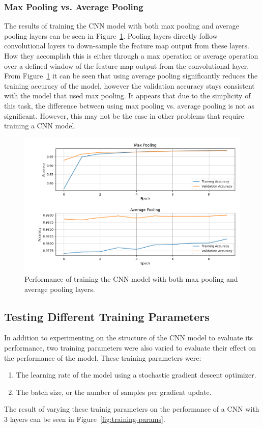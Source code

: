 \documentclass[a4paper]{article}
\begin{document}
\subsubsection{Max Pooling vs. Average Pooling}

The results of training the CNN model with both max pooling and average pooling layers can be seen in Figure~\ref{fig:pooling}. Pooling layers directly follow convolutional layers to down-sample the feature map output from these layers. How they accomplish this is either through a max operation or average operation over a defined window of the feature map output from the convolutional layer. From Figure~\ref{fig:pooling} it can be seen that using average pooling significantly reduces the training accuracy of the model, however the validation accuracy stays consistent with the model that used max pooling. It appears that due to the simplicity of this task, the difference between using max pooling vs. average pooling is not as significant. However, this may not be the case in other problems that require training a CNN model.

\begin{figure}[h!]
    \centering
    \includegraphics[scale=0.5]{images/max-avg-pooling-cnn.png}
    \caption{Performance of training the CNN model with both max pooling and average pooling layers.}
    \label{fig:pooling}
\end{figure}

\subsection{Testing Different Training Parameters}
In addition to experimenting on the structure of the CNN model to evaluate its performance, two training parameters were also varied to evaluate their effect on the performance of the model. These training parameters were:
\begin{enumerate}
    \item The learning rate of the model using a stochastic gradient descent optimizer.
    \item The batch size, or the number of samples per gradient update.
\end{enumerate}
The result of varying these trainig parameters on the performance of a CNN with 3 layers can be seen in Figure~\ref{fig:training-params}.
\end{document}
